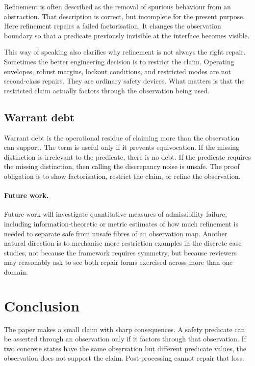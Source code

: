 \documentclass[a4paper,11pt]{article}
\begin{document}
Refinement is often described as the removal of spurious behaviour from an
abstraction. That description is correct, but incomplete for the present
purpose. Here refinement repairs a failed factorisation. It changes the
observation boundary so that a predicate previously invisible at the interface
becomes visible.

This way of speaking also clarifies why refinement is not always the right
repair. Sometimes the better engineering decision is to restrict the claim.
Operating envelopes, robust margins, lockout conditions, and restricted modes
are not second-class repairs. They are ordinary safety devices. What matters is
that the restricted claim actually factors through the observation being used.

\subsection{Warrant debt}

Warrant debt is the operational residue of claiming more than the observation
can support. The term is useful only if it prevents equivocation. If the missing
distinction is irrelevant to the predicate, there is no debt. If the predicate
requires the missing distinction, then calling the discrepancy noise is unsafe.
The proof obligation is to show factorisation, restrict the claim, or refine the
observation.

\paragraph{Future work.}
Future work will investigate quantitative measures of admissibility failure,
including information-theoretic or metric estimates of how much refinement is
needed to separate safe from unsafe fibres of an observation map. Another
natural direction is to mechanise more restriction examples in the discrete case
studies, not because the framework requires symmetry, but because reviewers may
reasonably ask to see both repair forms exercised across more than one domain.

\section{Conclusion}
\label{sec:conclusion}

The paper makes a small claim with sharp consequences. A safety predicate can be
asserted through an observation only if it factors through that observation. If
two concrete states have the same observation but different predicate values,
the observation does not support the claim. Post-processing cannot repair that
loss.
\end{document}
